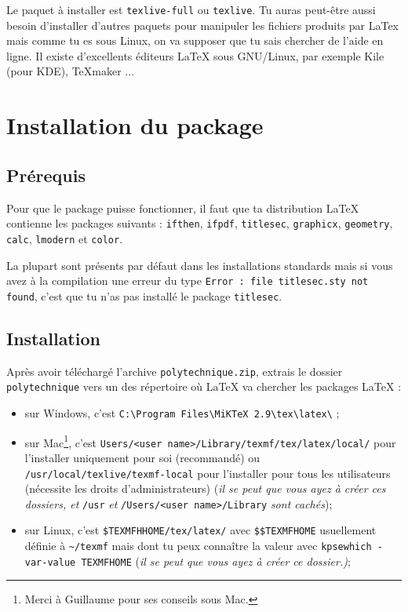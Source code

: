 \documentclass[a4paper,12pt,twoside]{article}
\begin{document}
Le paquet à installer est \texttt{texlive-full} ou \texttt{texlive}. Tu auras peut-être aussi besoin d'installer d'autres paquets pour manipuler les fichiers produits par LaTex mais comme tu es sous Linux, on va supposer que tu sais chercher de l'aide en ligne. Il existe d'excellents éditeurs LaTeX sous GNU/Linux, par exemple Kile (pour KDE), TeXmaker ...

\section{Installation du package}

\subsection{Prérequis}

Pour que le package puisse fonctionner, il faut que ta distribution LaTeX contienne les packages suivants : \texttt{ifthen}, \texttt{ifpdf}, \texttt{titlesec}, \texttt{graphicx}, \texttt{geometry}, \texttt{calc}, \texttt{lmodern} et \texttt{color}.

La plupart sont présents par défaut dans les installations standards mais si vous avez à la compilation une erreur du type \verb|Error : file titlesec.sty not found|, c'est que tu n'as pas installé le package \texttt{titlesec}.


\subsection{Installation}

Après avoir téléchargé l'archive \texttt{polytechnique.zip}, extrais le dossier \texttt{polytechnique} vers un des répertoire où \LaTeX{} va chercher les packages \LaTeX{} :
\begin{itemize}
	\item sur Windows, c'est \verb|C:\Program Files\MiKTeX 2.9\tex\latex\| ;
	\item sur Mac\footnote{Merci à Guillaume  pour ses conseils sous Mac.}, c'est \verb|Users/<user name>/Library/texmf/tex/latex/local/| pour l'installer uniquement pour soi (recommandé) ou \verb|/usr/local/texlive/texmf-local| pour l'installer pour tous les utilisateurs (nécessite les droits d'administrateurs) (\emph{il se peut que vous ayez à créer ces dossiers, et} \verb|/usr| \emph{et} \verb|/Users/<user name>/Library| \emph{sont cachés}); 
	\item sur Linux, c'est \verb|$TEXMFHHOME/tex/latex/| avec \verb|$$TEXMFHOME| usuellement définie à \verb|~/texmf| mais dont tu peux connaître la valeur avec \verb|kpsewhich -var-value TEXMFHOME| (\emph{il se peut que vous ayez à créer ce dossier.)};
\end{itemize}
\end{document}
